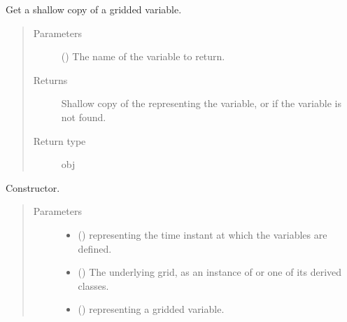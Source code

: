 \documentclass[letterpaper,10pt,english]{sphinxmanual}
\begin{document}
\begin{fulllineitems}
\begin{fulllineitems}
\label{\detokenize{api:storages.grid_data.GridData.__getitem__}}
Get a shallow copy of a gridded variable.
\begin{quote}\begin{description}
\item[{Parameters}] \leavevmode
{} () \textendash{} The name of the variable to return.

\item[{Returns}] \leavevmode
Shallow copy of the  representing the variable, or  if the variable is not found.

\item[{Return type}] \leavevmode
obj

\end{description}\end{quote}

\end{fulllineitems}


\begin{fulllineitems}
\label{\detokenize{api:storages.grid_data.GridData.__init__}}
Constructor.
\begin{quote}\begin{description}
\item[{Parameters}] \leavevmode\begin{itemize}
\item {} 
 () \textendash{}  representing the time instant at which the variables are defined.

\item {} 
 () \textendash{} The underlying grid, as an instance of {\hyperref[\detokenize{api:grids.grid_xyz.GridXYZ}]{}} or one of its derived classes.

\item {} 
 () \textendash{}  representing a gridded variable.


\end{itemize}
\end{description}
\end{quote}
\end{fulllineitems}
\end{fulllineitems}
\end{document}

